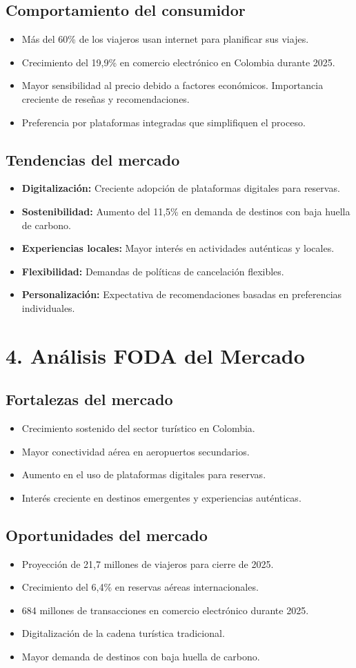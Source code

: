 \documentclass[12pt,a4paper]{article}
\newcommand{\sectiontitle}[1]{\section{#1}}
\newcommand{\subsectiontitle}[1]{\subsection{#1}}
\begin{document}
\subsectiontitle{Comportamiento del consumidor}

\begin{itemize}
    \item Más del 60\% de los viajeros usan internet para planificar sus viajes.
    \item Crecimiento del 19,9\% en comercio electrónico en Colombia durante 2025.
    \item Mayor sensibilidad al precio debido a factores económicos.
    Importancia creciente de reseñas y recomendaciones.
    \item Preferencia por plataformas integradas que simplifiquen el proceso.
\end{itemize}

\subsectiontitle{Tendencias del mercado}

\begin{itemize}
    \item \textbf{Digitalización:} Creciente adopción de plataformas digitales para reservas.
    \item \textbf{Sostenibilidad:} Aumento del 11,5\% en demanda de destinos con baja huella de carbono.
    \item \textbf{Experiencias locales:} Mayor interés en actividades auténticas y locales.
    \item \textbf{Flexibilidad:} Demandas de políticas de cancelación flexibles.
    \item \textbf{Personalización:} Expectativa de recomendaciones basadas en preferencias individuales.
\end{itemize}

\sectiontitle{4. Análisis FODA del Mercado}

\subsectiontitle{Fortalezas del mercado}

\begin{itemize}
    \item Crecimiento sostenido del sector turístico en Colombia.
    \item Mayor conectividad aérea en aeropuertos secundarios.
    \item Aumento en el uso de plataformas digitales para reservas.
    \item Interés creciente en destinos emergentes y experiencias auténticas.
\end{itemize}

\subsectiontitle{Oportunidades del mercado}

\begin{itemize}
    \item Proyección de 21,7 millones de viajeros para cierre de 2025.
    \item Crecimiento del 6,4\% en reservas aéreas internacionales.
    \item 684 millones de transacciones en comercio electrónico durante 2025.
    \item Digitalización de la cadena turística tradicional.
    \item Mayor demanda de destinos con baja huella de carbono.
\end{itemize}
\end{document}
